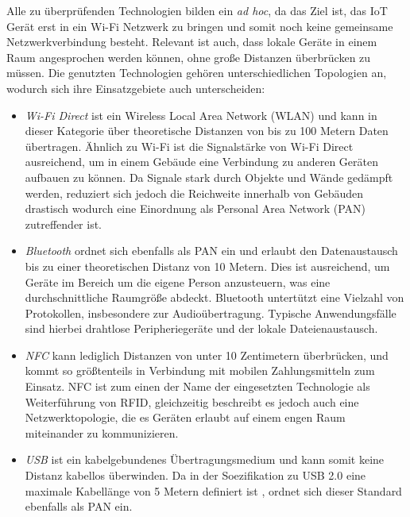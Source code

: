     Alle zu überprüfenden Technologien bilden ein {\it ad hoc}, da das Ziel ist, das IoT Gerät erst in ein Wi-Fi Netzwerk zu bringen und somit noch keine gemeinsame Netzwerkverbindung besteht. Relevant ist auch, dass lokale Geräte in einem Raum angesprochen werden können, ohne große Distanzen überbrücken zu müssen. Die genutzten Technologien gehören unterschiedlichen Topologien an, wodurch sich ihre Einsatzgebiete auch unterscheiden:
    \begin{itemize}
    \item {\it Wi-Fi Direct} ist ein Wireless Local Area Network (WLAN) und kann in dieser Kategorie über theoretische Distanzen von bis zu 100 Metern Daten übertragen. Ähnlich zu Wi-Fi ist die Signalstärke von Wi-Fi Direct ausreichend, um in einem Gebäude eine Verbindung zu anderen Geräten aufbauen zu können. Da Signale stark durch Objekte und Wände gedämpft werden, reduziert sich jedoch die Reichweite innerhalb von Gebäuden drastisch wodurch eine Einordnung als Personal Area Network (PAN) zutreffender ist.
    
    \item {\it Bluetooth} ordnet sich ebenfalls als PAN ein und erlaubt den Datenaustausch bis zu einer theoretischen Distanz von 10 Metern. Dies ist ausreichend, um Geräte im Bereich um die eigene Person anzusteuern, was eine durchschnittliche Raumgröße abdeckt. Bluetooth untertützt eine Vielzahl von Protokollen, insbesondere zur Audioübertragung. Typische Anwendungsfälle sind hierbei drahtlose Peripheriegeräte und der lokale Dateienaustausch.
    
    \item {\it NFC} kann lediglich Distanzen von unter 10 Zentimetern überbrücken, und kommt so größtenteils in Verbindung mit mobilen Zahlungsmitteln zum Einsatz. NFC ist zum einen der Name der eingesetzten Technologie als Weiterführung von RFID, gleichzeitig beschreibt es jedoch auch eine Netzwerktopologie, die es Geräten erlaubt auf einem engen Raum miteinander zu kommunizieren. 
    
    \item {\it USB} ist ein kabelgebundenes Übertragungsmedium und kann somit keine Distanz kabellos überwinden. Da in der Soezifikation zu USB 2.0 eine maximale Kabellänge von 5 Metern definiert ist \cite{usbSpec}, ordnet sich dieser Standard ebenfalls als PAN ein.
    
    \end{itemize}